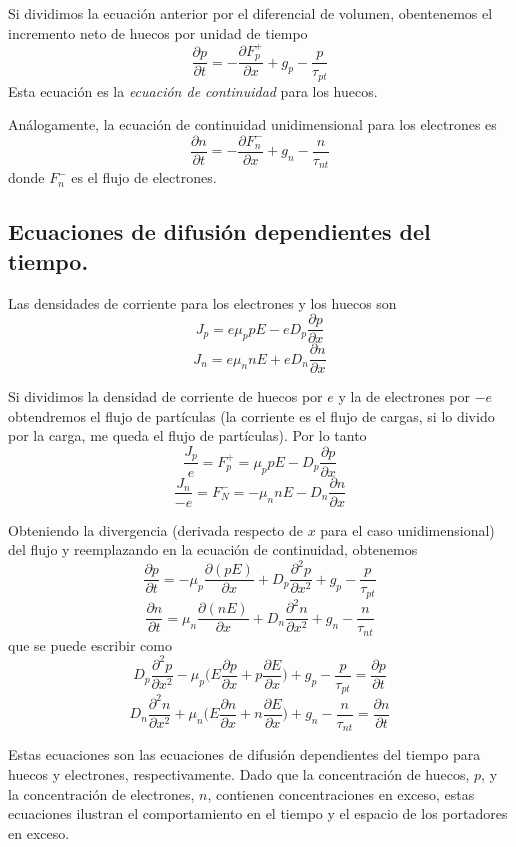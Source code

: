 \documentclass[12pt,a4paper]{article}
\begin{document}
Si dividimos la ecuación anterior por el diferencial de volumen, obentenemos el incremento neto de huecos por unidad de tiempo
\[ \frac{\partial p}{\partial t}=-\frac{\partial F_{p}^{+}}{\partial x}+g_{p}-\frac{p}{\tau _{pt}} \]
Esta ecuación es la \emph{ecuación de continuidad} para los huecos.

Análogamente, la ecuación de continuidad unidimensional para los electrones es
\[ \frac{\partial n}{\partial t}=-\frac{\partial F_{n}^{-}}{\partial x}+g_{n}-\frac{n}{\tau _{nt}} \]
donde $F_{n}^{-}$ es el flujo de electrones.

\subsection{Ecuaciones de difusión dependientes del tiempo.}

Las densidades de corriente para los electrones y los huecos son
\[ J_{p}=e\mu _{p}pE-eD_{p}\frac{\partial p}{\partial x} \]
\[ J_{n}=e\mu _{n}nE+eD_{n}\frac{\partial n}{\partial x} \]

Si dividimos la densidad de corriente de huecos por $e$ y la de electrones por $-e$ obtendremos el flujo de partículas (la corriente es el flujo de cargas, si lo divido por la carga, me queda el flujo de partículas). Por lo tanto
\[ \frac{J_{p}}{e}=F_{p}^{+}=\mu _{p}pE-D_{p}\frac{\partial p}{\partial x} \]
\[ \frac{J_{n}}{-e}=F_{N}^{-}=-\mu _{n}nE-D_{n}\frac{\partial n}{\partial x} \]

Obteniendo la divergencia (derivada respecto de $x$ para el caso unidimensional) del flujo y reemplazando en la ecuación de continuidad, obtenemos
\[ \frac{\partial p}{\partial t}=-\mu _{p} \frac{\partial (pE)}{\partial x} + D_{p} \frac{\partial^{2}p}{\partial x^{2}}+g_{p}-\frac{p}{\tau _{pt}} \]
\[ \frac{\partial n}{\partial t}=\mu _{n} \frac{\partial (nE)}{\partial x} + D_{n} \frac{\partial^{2}n}{\partial x^{2}}+g_{n}-\frac{n}{\tau _{nt}} \]
que se puede escribir como
\[ D_{p} \frac{\partial^{2}p}{\partial x^{2}}- \mu _{p} \bigg( E \frac{\partial p}{\partial x} + p \frac{\partial E}{\partial x} \bigg) + g_{p} - \frac{p}{\tau _{pt}} = \frac{\partial p}{\partial t} \]
\[ D_{n} \frac{\partial^{2}n}{\partial x^{2}}+ \mu _{n} \bigg( E \frac{\partial n}{\partial x} + n \frac{\partial E}{\partial x} \bigg) + g_{n} - \frac{n}{\tau _{nt}} = \frac{\partial n}{\partial t} \]

Estas ecuaciones son las ecuaciones de difusión dependientes del tiempo para huecos y electrones, respectivamente. Dado que la concentración de huecos, $p$, y la concentración de electrones, $n$, contienen concentraciones en exceso, estas ecuaciones ilustran el comportamiento en el tiempo y el espacio de los portadores en exceso.
\end{document}
